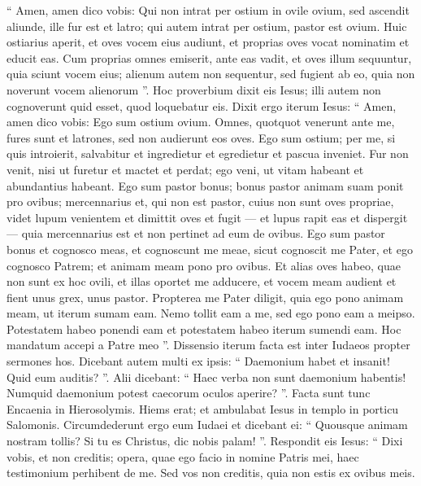 \begin{biblechapter}
\begin{biblechapter}
\begin{biblechapter}
\begin{biblechapter}
\begin{biblechapter}
\begin{biblechapter}
\begin{biblechapter}
\begin{biblechapter}
\begin{biblechapter}
\begin{biblechapter}
\verse “ Amen, amen dico vobis: Qui non intrat per ostium in ovile ovium, sed ascendit aliunde, ille fur est et latro; 
\verse qui autem intrat per ostium, pastor est ovium. 
\verse Huic ostiarius aperit, et oves vocem eius audiunt, et proprias oves vocat nominatim et educit eas. 
\verse Cum proprias omnes emiserit, ante eas vadit, et oves illum sequuntur, quia sciunt vocem eius; 
\verse alienum autem non sequentur, sed fugient ab eo, quia non noverunt vocem alienorum ”. 
\verse Hoc proverbium dixit eis Iesus; illi autem non cognoverunt quid esset, quod loquebatur eis.
 \verse Dixit ergo iterum Iesus: “ Amen, amen dico vobis: Ego sum ostium ovium. 
\verse Omnes, quotquot venerunt ante me, fures sunt et latrones, sed non audierunt eos oves. 
\verse Ego sum ostium; per me, si quis introierit, salvabitur et ingredietur et egredietur et pascua inveniet. 
\verse Fur non venit, nisi ut furetur et mactet et perdat; ego veni, ut vitam habeant et abundantius habeant. 
 \verse Ego sum pastor bonus; bonus pastor animam suam ponit pro ovibus; 
\verse mercennarius et, qui non est pastor, cuius non sunt oves propriae, videt lupum venientem et dimittit oves et fugit — et lupus rapit eas et dispergit — 
\verse quia mercennarius est et non pertinet ad eum de ovibus. 
\verse Ego sum pastor bonus et cognosco meas, et cognoscunt me meae, 
\verse sicut cognoscit me Pater, et ego cognosco Patrem; et animam meam pono pro ovibus. 
\verse Et alias oves habeo, quae non sunt ex hoc ovili, et illas oportet me adducere, et vocem meam audient et fient unus grex, unus pastor. 
\verse Propterea me Pater diligit, quia ego pono animam meam, ut iterum sumam eam. 
\verse Nemo tollit eam a me, sed ego pono eam a meipso. Potestatem habeo ponendi eam et potestatem habeo iterum sumendi eam. Hoc mandatum accepi a Patre meo ”.
 \verse Dissensio iterum facta est inter Iudaeos propter sermones hos. 
\verse Dicebant autem multi ex ipsis: “ Daemonium habet et insanit! Quid eum auditis? ”. 
\verse Alii dicebant: “ Haec verba non sunt daemonium habentis! Numquid daemonium potest caecorum oculos aperire? ”.
 \verse Facta sunt tunc Encaenia in Hierosolymis. Hiems erat; 
\verse et ambulabat Iesus in templo in porticu Salomonis. 
\verse Circumdederunt ergo eum Iudaei et dicebant ei: “ Quousque animam nostram tollis? Si tu es Christus, dic nobis palam! ”. 
\verse Respondit eis Iesus: “ Dixi vobis, et non creditis; opera, quae ego facio in nomine Patris mei, haec testimonium perhibent de me. 
\verse Sed vos non creditis, quia non estis ex ovibus meis. 

\end{biblechapter}
\end{biblechapter}
\end{biblechapter}
\end{biblechapter}
\end{biblechapter}
\end{biblechapter}
\end{biblechapter}
\end{biblechapter}
\end{biblechapter}
\end{biblechapter}
